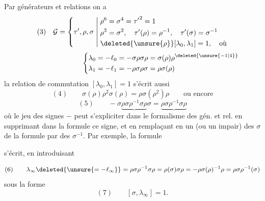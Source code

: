 Par générateurs et relations on a
\[
(3)\quad\mathcal{G}=\left\{\tau',\rho,\sigma\;\middle|\;
\begin{aligned}
&\rho^6=\sigma^4={\tau'}^2=1\\
&\rho^3=\sigma^2,\quad\tau'(\rho)=\rho^{-1},\quad\tau'(\sigma)=\sigma^{-1}\\
&\deleted{\unsure{\rho}}[\lambda_0,\lambda_1]=1,\quad\text{où}
\end{aligned}\right.
\]
\[
\hspace{8em}\left\{
\begin{aligned}
\lambda_0&=-\ell_0=-\sigma\rho\sigma\rho=\sigma(\rho)\rho^{\deleted{\unsure{-1|4}}}\\
\lambda_1&=-\ell_1=-\rho\sigma\rho\sigma=\rho\sigma(\rho)
\end{aligned}\right.
\]
 la relation de commutation $[\lambda_0,\lambda_1]=1$ s'écrit aussi
\[
(4)\qquad \sigma(\rho)\rho^2\sigma(\rho)=\rho\sigma(\rho^2)\rho
\qquad\text{ou encore}
\]
\[
(5)\qquad -\sigma\underbrace{\rho\sigma\rho^{-1}\sigma\rho}\sigma
=\underbrace{\rho\sigma\rho^{-1}\sigma\rho}
\]
où le jeu des signes $-$ peut s'expliciter dans le formalisme des gén. et rel. en supprimant dans la formule ce signe, et en remplaçant en  un (ou un  impair) des $\sigma$ de la formule par des $\sigma^{-1}$. Par exemple, la formule



s'écrit, en introduisant


\[
(6)\qquad
\lambda_\infty\deleted{\unsure{=-\ell_\infty}}
=\rho\sigma\rho^{-1}\sigma\rho
=\rho(\sigma)\sigma\rho
=-\rho\sigma(\rho)^{-1}\rho
=\rho\sigma\rho^{-1}(\sigma)
\]
sous la forme
\[
(7)\qquad [\sigma,\lambda_\infty]=1.
\]


